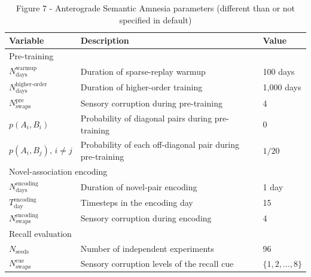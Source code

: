 \documentclass{article}
\begin{document}
\begin{table}[h!]
\centering
\caption{Figure 7 - Anterograde Semantic Amnesia parameters (different than or not specified in default)}
\label{tab:anterograde_amnesia}
\begin{tabular}{lll}
\toprule
\textbf{Variable} & \textbf{Description} & \textbf{Value} \\
\midrule
\multicolumn{3}{l}{Pre-training} \\
$N_{\textrm{days}}^{\textrm{warmup}}$ & Duration of sparse-replay warmup & 100 days \\
$N_{\textrm{days}}^{\textrm{higher-order}}$ & Duration of higher-order training & 1,000 days \\
$N_{\textrm{swaps}}^{\textrm{pre}}$ & Sensory corruption during pre-training & 4 \\
$p(A_i,B_i)$ & Probability of diagonal pairs during pre-training & 0 \\
$p(A_i,B_j),\, i\ne j$ & Probability of each off-diagonal pair during pre-training & $1/20$ \\
\midrule
\multicolumn{3}{l}{Novel-association encoding} \\
$N_{\textrm{days}}^{\textrm{encoding}}$ & Duration of novel-pair encoding & 1 day \\
$T_{\textrm{day}}^{\textrm{encoding}}$ & Timesteps in the encoding day & 15 \\
$N_{\textrm{swaps}}^{\textrm{encoding}}$ & Sensory corruption during encoding & 4 \\
\midrule
\multicolumn{3}{l}{Recall evaluation} \\
$N_{\textrm{seeds}}$ & Number of independent experiments & 96 \\
$N_{\textrm{swaps}}^{\textrm{cue}}$ & Sensory corruption levels of the recall cue & $\{1,2,\ldots,8\}$ \\
\bottomrule
\end{tabular}
\end{table}
\end{document}

